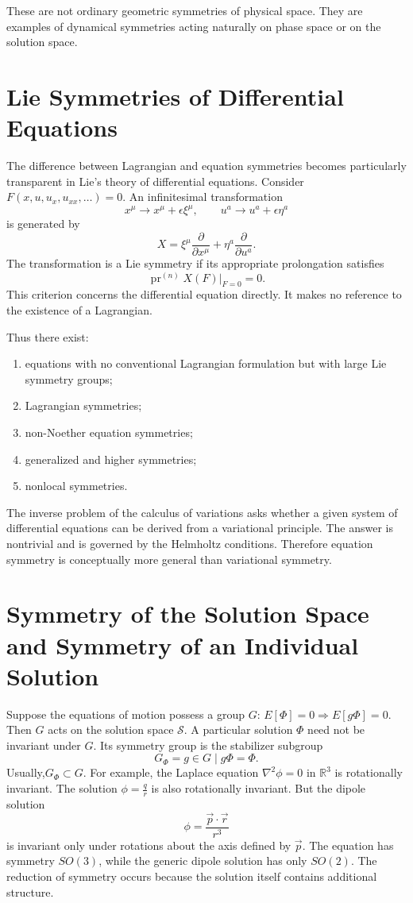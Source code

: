 These are not ordinary geometric symmetries of physical space.  They are
examples of dynamical symmetries acting naturally on phase space or on the
solution space.

\section{ Lie Symmetries of Differential Equations}
The difference between Lagrangian and equation symmetries becomes particularly
transparent in Lie's theory of differential equations.
Consider $F(x,u,u_x,u_{xx},\ldots)=0$.
An infinitesimal transformation
\[x^\mu\rightarrow x^\mu+\epsilon\xi^\mu,
\qquad
u^a\rightarrow u^a+\epsilon\eta^a
\]
is generated by
\[X=\xi^\mu\frac{\partial}{\partial x^\mu}
+\eta^a\frac{\partial}{\partial u^a}.
\]
The transformation is a Lie symmetry if its appropriate prolongation satisfies
\[\operatorname{pr}^{(n)}X(F)\big|_{F=0}=0.\]
This criterion concerns the differential equation directly.  It makes no
reference to the existence of a Lagrangian.

Thus there exist:
\begin{enumerate}
\item equations with no conventional Lagrangian formulation but with large Lie
    symmetry groups;
\item Lagrangian symmetries;
\item non-Noether equation symmetries;
\item generalized and higher symmetries;
\item nonlocal symmetries.
\end{enumerate}
The inverse problem of the calculus of variations asks whether a given system
of differential equations can be derived from a variational principle.  The
answer is nontrivial and is governed by the Helmholtz conditions.
Therefore equation symmetry is conceptually more general than variational symmetry.

\section{Symmetry of the Solution Space and Symmetry of an Individual Solution}
Suppose the equations of motion possess a group $G$:
$E[\Phi]=0 \Rightarrow E[g\Phi]=0$.
Then $G$ acts on the solution space $\mathcal{S}$.
A particular solution $\Phi$ need not be invariant under $G$.
Its symmetry group is the stabilizer subgroup
\[G_\Phi={g\in G\mid g\Phi=\Phi}.\]
Usually,$G_\Phi\subset G$.
For example, the Laplace equation
$\nabla^2\phi=0$ in $\mathbb{R}^3$ is rotationally invariant.
The solution $\phi=\tfrac{q}{r}$ is also rotationally invariant.
But the dipole solution
\[\phi=\frac{\vec{p}\cdot\vec{r}}{r^3}\]
is invariant only under rotations about the axis defined by $\vec{p}$.
The equation has symmetry $SO(3)$,
while the generic dipole solution has only $SO(2)$.
The reduction of symmetry occurs because the solution itself contains
additional structure.

